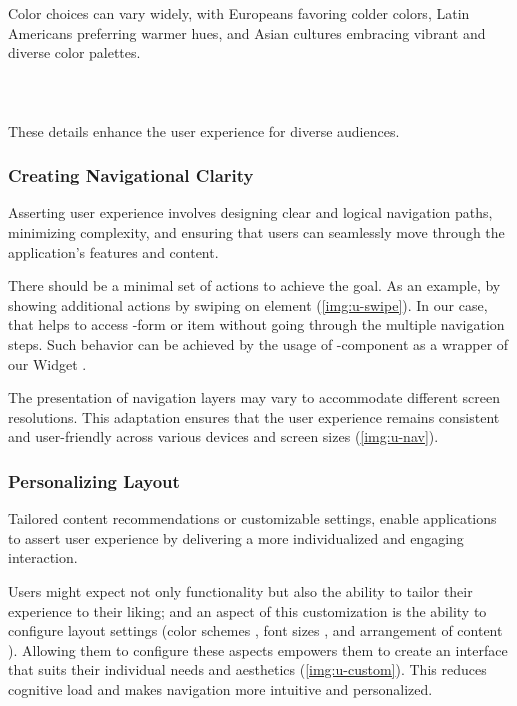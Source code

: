 Color choices can vary widely, with Europeans favoring colder colors, Latin Americans preferring warmer hues, and Asian 
cultures embracing vibrant and diverse color palettes. \\
\\

\noindent {} \\
\\

\noindent These details \cite{Rein14} enhance the user experience for diverse audiences.


\subsubsection{Creating Navigational Clarity} 

Asserting user experience involves designing clear and logical navigation paths, minimizing complexity, and ensuring 
that users can seamlessly move through the application's features and content.

There should be a minimal set of actions to achieve the goal. As an example, by showing additional actions by swiping 
on element (\cref{img:u-swipe}). In our case, that helps to access -form or  item without going 
through the multiple navigation steps. Such behavior can be achieved by the usage of 
-component as a wrapper of our Widget .


\noindent The presentation of navigation layers may vary to accommodate different screen resolutions. This adaptation 
ensures that the user experience remains consistent and user-friendly across various devices and screen sizes 
(\cref{img:u-nav}).



\subsubsection{Personalizing Layout}

Tailored content recommendations or customizable settings, enable applications to assert user experience by delivering 
a more individualized and engaging interaction.

Users might expect not only functionality but also the ability to tailor their experience to their liking; and an 
aspect of this customization is the ability to configure layout settings (color schemes , font sizes 
, and arrangement of content ). Allowing them to configure these aspects empowers them to 
create an interface that suits their individual needs and aesthetics (\cref{img:u-custom}). This reduces cognitive 
load and makes navigation more intuitive and personalized.

